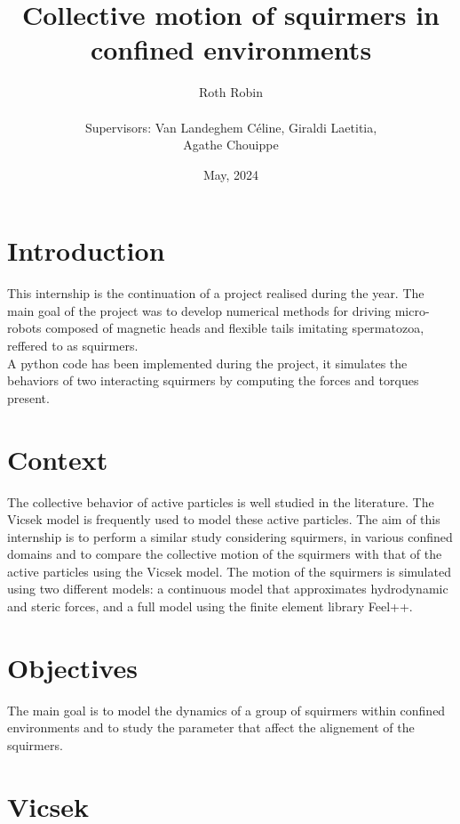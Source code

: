 \documentclass{article}
\begin{document}
\title{Collective motion of squirmers in confined environments}
\author{Roth Robin\\
\\
Supervisors: Van Landeghem Céline, Giraldi Laetitia,\\ Agathe Chouippe}
\date{May, 2024}
\maketitle

\tableofcontents

\section{Introduction}
This internship is the continuation of a project realised during the year. The main goal of the project was
to develop numerical methods for driving micro-robots composed of magnetic heads and flexible tails imitating spermatozoa, reffered to as squirmers.\\
A python code has been implemented during the project, it simulates the behaviors of two interacting squirmers by computing 
the forces and torques present.\\
\section{Context}
The collective behavior of active particles is well studied in the literature. 
The Vicsek model is frequently used to model these active particles. 
The aim of this internship is to perform a similar study considering squirmers, 
in various confined domains and to compare the collective motion of the squirmers with that of the active particles using the Vicsek model. 
The motion of the squirmers is simulated using two different models: a continuous model that approximates hydrodynamic and 
steric forces, and a full model using the finite element library Feel++.

\section{Objectives}
The main goal is to model the dynamics of a group of squirmers within confined environments and to
 study the parameter that affect the alignement of the squirmers.

\section{Vicsek}
\end{document}
